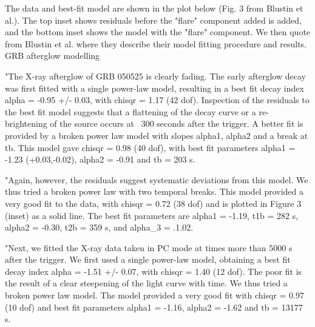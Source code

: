 The data and best-fit model are shown in the plot below (Fig. 3 from Blustin et al.). The top inset shows residuals before the "flare" component added is added, and the bottom inset shows the model with the "flare" component. We then quote from Blustin et al. where they describe their model fitting procedure and results.
GRB afterglow modelling

"The X-ray afterglow of GRB 050525 is clearly fading. The early afterglow decay was first fitted with a single power-law model, resulting in a best fit decay index alpha = -0.95 +/- 0.03, with chisqr = 1.17 (42 dof). Inspection of the residuals to the best fit model suggests that a flattening of the decay curve or a re-brightening of the source occurs at ~300 seconds after the trigger. A better fit is provided by a broken power law model with slopes alpha1, alpha2 and a break at tb. This model gave chisqr = 0.98 (40 dof), with best fit parameters alpha1 = -1.23 (+0.03,-0.02), alpha2 = -0.91 and tb = 203 s.

"Again, however, the residuals suggest systematic deviations from this model. We thus tried a broken power law with two temporal breaks. This model provided a very good fit to the data, with chisqr = 0.72 (38 dof) and is plotted in Figure 3 (inset) as a solid line. The best fit parameters are alpha1 = -1.19, t1b = 282 s, alpha2 = -0.30, t2b = 359 s, and alpha_3 = .1.02.

"Next, we fitted the X-ray data taken in PC mode at times more than 5000 s after the trigger. We first used a single power-law model, obtaining a best fit decay index alpha = -1.51 +/- 0.07, with chisqr = 1.40 (12 dof). The poor fit is the result of a clear steepening of the light curve with time. We thus tried a broken power law model. The model provided a very good fit with chisqr = 0.97 (10 dof) and best fit parameters alpha1 = -1.16, alpha2 = -1.62 and tb = 13177 s.

